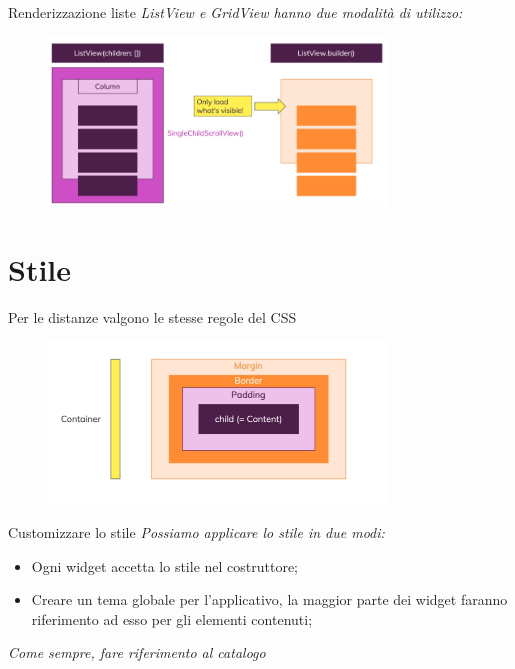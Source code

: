 \documentclass{../libs/presentation_format}
\begin{document}
\begin{frame}{Renderizzazione liste}
	\emph{ListView e GridView hanno due modalità di utilizzo: }
	\newline
	\begin{figure}[htpb]
		\centering
		\includegraphics[width=9cm]{../libs/list-view-utilization}
	\end{figure}
\end{frame}



\section{Stile}
\begin{frame}{Per le distanze valgono le stesse regole del CSS}
	\begin{figure}[htpb]
		\centering
		\includegraphics[width=9cm]{../libs/container-style}
	\end{figure}
\end{frame}


\begin{frame}{Customizzare lo stile}
	\emph{Possiamo applicare lo stile in due modi:}
	\begin{itemize}
		\item Ogni widget accetta lo stile nel costruttore;
		\item Creare un tema globale per l'applicativo, la maggior parte dei widget faranno riferimento ad esso per gli elementi contenuti;
	\end{itemize}
	\emph{Come sempre, fare riferimento al catalogo}
	\newline
	\centering
	\href{https://docs.flutter.dev/development/ui/widgets}{}
\end{frame}
\end{document}
